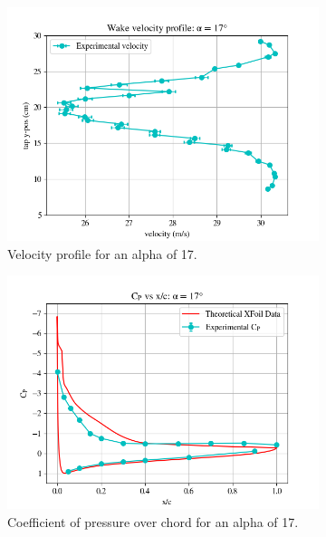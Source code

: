 \documentclass[11pt, letterpaper]{article}
\begin{document}
\begin{figure}[h]
  \begin{subfigure}{0.5\textwidth}
    \centering
    \includegraphics[width=1\linewidth]{Figures/vel-graphs/vel-a17.png}
    \caption{Velocity profile for an alpha of 17\degree.}
    \label{fig:vel-a17}
  \end{subfigure}%
  \begin{subfigure}{0.5\textwidth}
    \centering
    \includegraphics[width=1\textwidth]{Figures/C_p-a17.png}
    \caption{Coefficient of pressure over chord for an alpha of 17\degree.}
    \label{fig:C_p-a17}
  \end{subfigure}
  \caption{}
  \label{fig:two4}
\end{figure}
\end{document}
